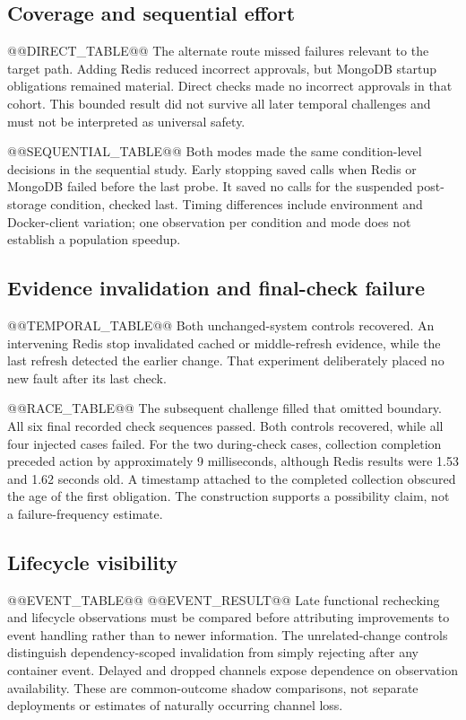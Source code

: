 \documentclass[manuscript,review,nonacm]{acmart}
\begin{document}
\subsection{Coverage and sequential effort}
@@DIRECT_TABLE@@
The alternate route missed failures relevant to the target path. Adding Redis reduced incorrect approvals, but MongoDB startup obligations remained material. Direct checks made no incorrect approvals in that cohort. This bounded result did not survive all later temporal challenges and must not be interpreted as universal safety.

@@SEQUENTIAL_TABLE@@
Both modes made the same condition-level decisions in the sequential study. Early stopping saved calls when Redis or MongoDB failed before the last probe. It saved no calls for the suspended post-storage condition, checked last. Timing differences include environment and Docker-client variation; one observation per condition and mode does not establish a population speedup.

\subsection{Evidence invalidation and final-check failure}
@@TEMPORAL_TABLE@@
Both unchanged-system controls recovered. An intervening Redis stop invalidated cached or middle-refresh evidence, while the last refresh detected the earlier change. That experiment deliberately placed no new fault after its last check.

@@RACE_TABLE@@
The subsequent challenge filled that omitted boundary. All six final recorded check sequences passed. Both controls recovered, while all four injected cases failed. For the two during-check cases, collection completion preceded action by approximately 9 milliseconds, although Redis results were 1.53 and 1.62 seconds old. A timestamp attached to the completed collection obscured the age of the first obligation. The construction supports a possibility claim, not a failure-frequency estimate.

\subsection{Lifecycle visibility}
@@EVENT_TABLE@@
@@EVENT_RESULT@@
Late functional rechecking and lifecycle observations must be compared before attributing improvements to event handling rather than to newer information. The unrelated-change controls distinguish dependency-scoped invalidation from simply rejecting after any container event. Delayed and dropped channels expose dependence on observation availability. These are common-outcome shadow comparisons, not separate deployments or estimates of naturally occurring channel loss.
\end{document}
